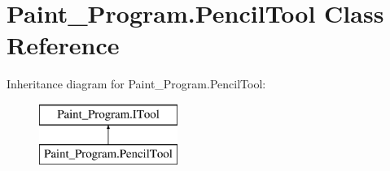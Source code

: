 \hypertarget{class_paint___program_1_1_pencil_tool}{}\section{Paint\+\_\+\+Program.\+Pencil\+Tool Class Reference}
\label{class_paint___program_1_1_pencil_tool}
Inheritance diagram for Paint\+\_\+\+Program.\+Pencil\+Tool\+:\begin{figure}[H]
\begin{center}
\leavevmode
\includegraphics[height=2.000000cm]{class_paint___program_1_1_pencil_tool}
\end{center}
\end{figure}
